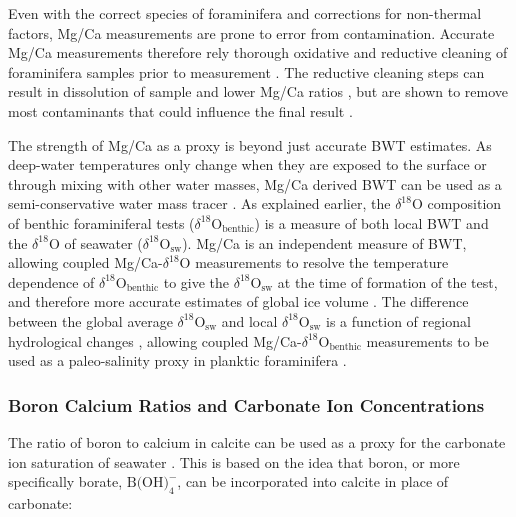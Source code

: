 Even with the correct species of foraminifera and corrections for non-thermal factors, Mg/Ca measurements are prone to error from contamination. Accurate Mg/Ca measurements therefore rely thorough oxidative and reductive cleaning of foraminifera samples prior to measurement \citep{boyleComparisonAtlanticPacific1985, barkerStudyCleaningProcedures2003}. The reductive cleaning steps can result in dissolution of sample and lower Mg/Ca ratios \citep{elderfieldCalibrationsBenthicForaminiferal2006, yuPreferentialDissolutionBenthic2007}, but are shown to remove most contaminants that could influence the final result \citep{weldeabComparisonForaminiferalCleaning2006}. 

The strength of Mg/Ca as a proxy is beyond just accurate BWT estimates. As deep-water temperatures only change when they are exposed to the surface or through mixing with other water masses, Mg/Ca derived BWT can be used as a semi-conservative water mass tracer \citep{woodardAntarcticRoleNorthern2014, jakobDeepoceanCirculationNorth2021}. As explained earlier, the $\delta^{18}\text{O}$ composition of benthic foraminiferal tests ($\delta^{18}\text{O}_\text{benthic}$) is a measure of both local BWT and the $\delta^{18}\text{O}$ of seawater ($\delta^{18}\text{O}_\text{sw}$). Mg/Ca is an independent measure of BWT, allowing coupled Mg/Ca-$\delta^{18}\text{O}$ measurements to resolve the temperature dependence of $\delta^{18}\text{O}_\text{benthic}$ to give the $\delta^{18}\text{O}_\text{sw}$ at the time of formation of the test, and therefore more accurate estimates of global ice volume \citep{elderfieldEvolutionOceanTemperature2012, raymoAccuracyMidPlioceneD18Obased2018}. The difference between the global average $\delta^{18}\text{O}_\text{sw}$ and local $\delta^{18}\text{O}_\text{sw}$ is a function of regional hydrological changes \citep{gonfiantiniStableIsotopeFractionations2020}, allowing coupled Mg/Ca-$\delta^{18}\text{O}_\text{benthic}$ measurements to be used as a paleo-salinity proxy in planktic foraminifera \citep{flowerPhasingDeglacialWarming2004,  schmidtLinksSalinityVariation2004, nurnbergInteractingLoopCurrent2008}.


\subsubsection{Boron Calcium Ratios and Carbonate Ion Concentrations}
\label{sec:baca}

The ratio of boron to calcium in calcite can be used as a proxy for the carbonate ion saturation of seawater \citep{honischBoronProxiesPaleoceanography2019}. This is based on the idea that boron, or more specifically borate, $\text{B(OH)}_{4}^{-}$, can be incorporated into calcite in place of carbonate:

